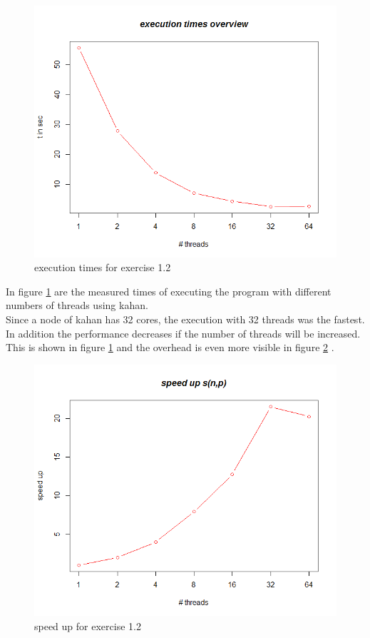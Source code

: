 \documentclass[11pt,a4paper]{article}
\begin{document}
\begin{figure}[ht]
\centering
  \includegraphics[scale=0.35]{statistics/Ex12ResultGraph.png}
	\caption{execution times for exercise 1.2}
	\label{ex12execution}
\end{figure}



In figure \ref{ex12execution} are the measured times of executing the program with different numbers of threads using kahan.\\

Since a node of kahan has 32 cores, the execution with 32 threads was the fastest. In addition the performance decreases if the number of threads will be increased. This is shown in figure \ref{ex12execution} and the overhead is even more visible in figure \ref{ex12speedUp} .

\begin{figure}[ht]
\centering
  \includegraphics[scale=0.35]{statistics/Ex12SpeedUpGraph.png}
	\caption{speed up for exercise 1.2}
	\label{ex12speedUp}
\end{figure}
\end{document}
